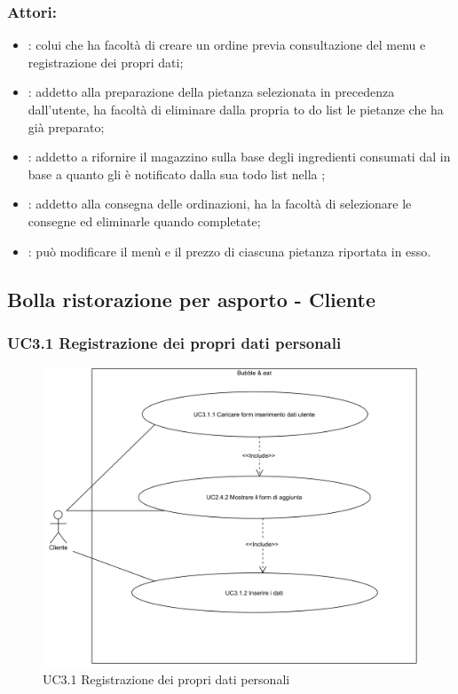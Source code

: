 \subsubsection{Attori:}
\begin{itemize}
	\item {}: colui che ha facoltà di creare un ordine previa consultazione del menu e registrazione dei propri dati;
	\item {}: addetto alla preparazione della pietanza selezionata in precedenza dall'utente, ha facoltà di eliminare dalla propria to do list le pietanze che ha già preparato;
	\item {}: addetto a rifornire il magazzino sulla base degli ingredienti consumati dal  in base a quanto gli è notificato dalla sua todo list nella ;
	\item {}: addetto alla consegna delle ordinazioni, ha la facoltà di selezionare le consegne ed eliminarle quando completate;
	\item {}: può modificare il menù e il prezzo di ciascuna pietanza riportata in esso.
\end{itemize}

\subsection{Bolla ristorazione per asporto - Cliente}

\subsubsection{UC3.1 Registrazione dei propri dati personali} \label{UC3.1}

\begin{figure}[H]
	\centering
	\includegraphics[width=15cm]{../../documenti/AnalisiDeiRequisiti/Diagrammi_img/uc3_1.png}
	\caption{UC3.1 Registrazione dei propri dati personali}
\end{figure}

